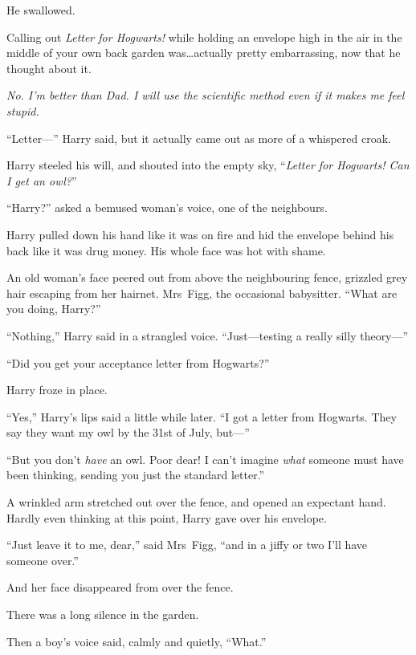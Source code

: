 He swallowed.

Calling out \emph{Letter for Hogwarts!} while holding an envelope high in the air in the middle of your own back garden was…actually pretty embarrassing, now that he thought about it.

\emph{No. I’m better than Dad. I will use the scientific method even if it makes me feel stupid.}

“Letter—” Harry said, but it actually came out as more of a whispered croak.

Harry steeled his will, and shouted into the empty sky, “\emph{Letter for Hogwarts! Can I get an owl?}”

“Harry?” asked a bemused woman’s voice, one of the neighbours.

Harry pulled down his hand like it was on fire and hid the envelope behind his back like it was drug money. His whole face was hot with shame.

An old woman’s face peered out from above the neighbouring fence, grizzled grey hair escaping from her hairnet. Mrs~Figg, the occasional babysitter. “What are you doing, Harry?”

“Nothing,” Harry said in a strangled voice. “Just—testing a really silly theory—”

“Did you get your acceptance letter from Hogwarts?”

Harry froze in place.

“Yes,” Harry’s lips said a little while later. “I got a letter from Hogwarts. They say they want my owl by the 31st of July, but—”

“But you don’t \emph{have} an owl. Poor dear! I can’t imagine \emph{what} someone must have been thinking, sending you just the standard letter.”

A wrinkled arm stretched out over the fence, and opened an expectant hand. Hardly even thinking at this point, Harry gave over his envelope.

“Just leave it to me, dear,” said Mrs~Figg, “and in a jiffy or two I’ll have someone over.”

And her face disappeared from over the fence.

There was a long silence in the garden.

Then a boy’s voice said, calmly and quietly, “What.”
